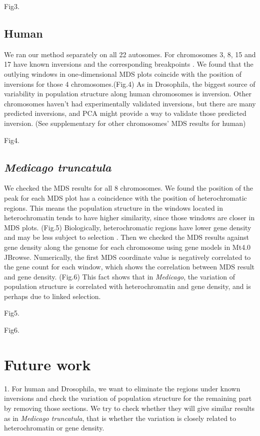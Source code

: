 \documentclass[11pt, oneside]{article}   	%
\begin{document}
Fig3.

\subsection{Human}
We ran our method separately on all 22 autosomes. For chromosomes 3, 8, 15 and 17 have known inversions and the corresponding breakpoints \cite{key12}. We found that the outlying windows in one-dimensional MDS plots coincide with the position of inversions for those 4 chromosomes.(Fig.4) As in Drosophila, the biggest source of variability in population structure along human chromosomes is inversion. Other chromosomes haven't had experimentally validated inversions, but there are many predicted inversions, and PCA might provide a way to validate those predicted inversion. \cite{key13} (See supplementary for other chromosomes' MDS results for human)

Fig4.

\subsection{\textit{Medicago truncatula}}
We checked the MDS results for all 8 chromosomes. We found the position of the peak for each MDS plot has a coincidence with the position of heterochromatic regions. This means the population structure in the windows located in heterochromatin tends to have higher similarity, since those windows are closer in MDS plots. (Fig.5) Biologically,
heterochromatic regions have lower gene density and may be less subject to selection \cite{key15,key16}. Then we checked the MDS results against gene density along the genome for each chromosome using gene models in Mt4.0 JBrowse. Numerically, the first MDS coordinate value is negatively correlated to the gene count for each window, which shows the correlation between MDS result and gene density. (Fig.6) This fact shows that in \textit{Medicago}, the variation of population structure is correlated with heterochromatin and gene density, and is perhaps due to linked selection.

Fig5.

Fig6.

\section{Future work}
1. For human and Drosophila, we want to eliminate the regions under known inversions and check the variation of population structure for the remaining part by removing those sections. We try to check whether they will give similar results as in \textit{Medicago truncatula}, that is whether the variation is closely related to heterochromatin or gene density.
\end{document}
